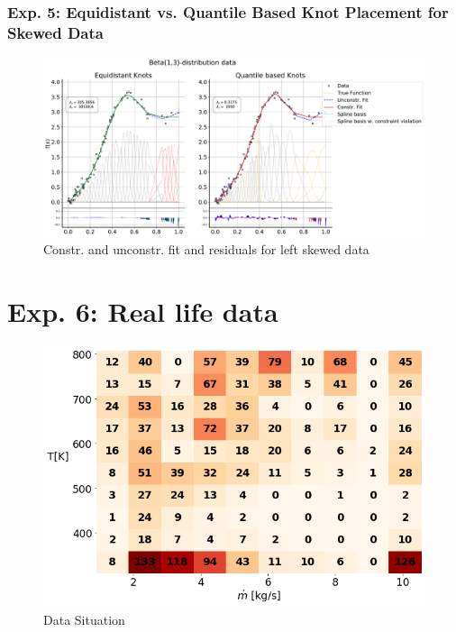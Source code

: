 \documentclass[10pt,a4paper]{article}
\begin{document}
\subsubsection{Exp. 5: Equidistant vs. Quantile Based Knot Placement for Skewed Data}


\begin{figure}[H]
	\centering
	\includegraphics[width=\columnwidth]{../thesisplots/exp_beta/exp_left_skewed_data_ndata_250_rseed_1.pdf}
	\caption{Constr. and unconstr. fit and residuals for left skewed data}
	\label{fig:fit_left_skew_250}
\end{figure}

\section{Exp. 6: Real life data}

\begin{figure}[H]
	\centering
	\includegraphics[width=\columnwidth]{../thesisplots/ebner/data_distribution.png}
	\caption{Data Situation}
	\label{fig:ebner_data_situation}
\end{figure}
\end{document}
